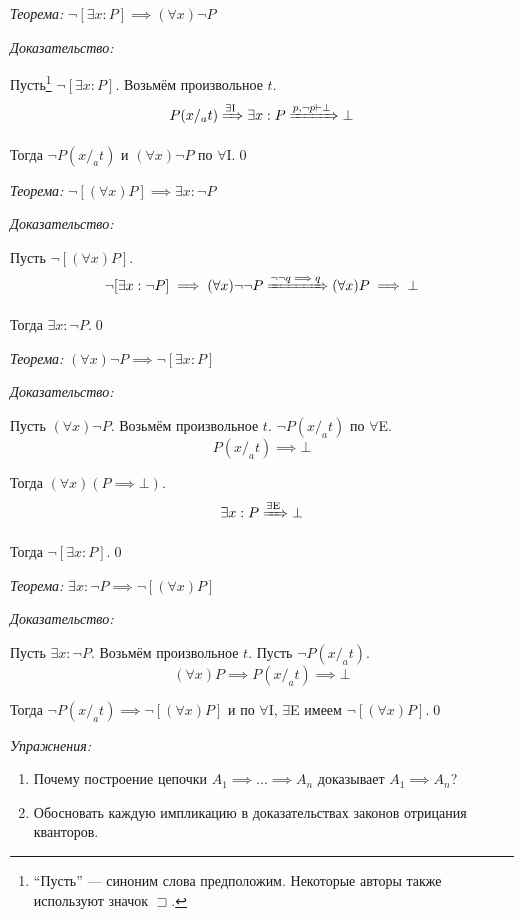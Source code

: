 {\it Теорема:} $\lnot[\exists x:P]\implies (\forall x)\lnot P$

{\it Доказательство:}

Пусть\footnote{
	``Пусть'' --- синоним слова предположим. Некоторые авторы также
	используют значок $\sqsupset$.
} $\lnot[\exists x:P]$. Возьмём произвольное $t$.
\[
	P(x/_{a}t)\xRightarrow{\text{$\exists$I}} \exists x:P
	\xRightarrow{p,\lnot p\vdash\bot} \bot
\]

Тогда $\lnot P(x/_{a}t)$ и $(\forall x)\lnot P$
по $\forall$I.\qed

{\it Теорема:} $\lnot[(\forall x)P]\implies \exists x:\lnot P$

{\it Доказательство:}

Пусть $\lnot[(\forall x)P]$.
\[
	\lnot[\exists x:\lnot P]\implies (\forall x)\lnot\lnot P
	\xRightarrow{\lnot\lnot q\implies q} (\forall x)P\implies\bot
\]

Тогда $\exists x:\lnot P$.\qed

{\it Теорема:} $(\forall x)\lnot P\implies \lnot[\exists x:P]$

{\it Доказательство:}

Пусть $(\forall x)\lnot P$. Возьмём произвольное $t$. $\lnot P(x/_{a}t)$ по $\forall$E.
\[
	P(x/_{a}t)\implies \bot
\]

Тогда $(\forall x)(P\implies \bot)$.
\[
	\exists x:P\xRightarrow{\text{$\exists$E}} \bot
\]

Тогда $\lnot[\exists x:P]$.\qed

{\it Теорема:} $\exists x:\lnot P\implies\lnot[(\forall x)P]$

{\it Доказательство:}

Пусть $\exists x:\lnot P$. Возьмём произвольное $t$. Пусть $\lnot P(x/_{a}t)$.
\[
	(\forall x)P\implies P(x/_{a}t)\implies \bot
\]

Тогда ${\lnot P(x/_{a}t)\implies \lnot[(\forall x)P]}$ и по $\forall$I, $\exists$E
имеем $\lnot[(\forall x)P]$.\qed

{\it Упражнения:}
\begin{enumerate}
	\item{}Почему построение цепочки $A_1\implies...\implies A_{n}$
	доказывает $A_1\implies A_{n}$?
	\item{}Обосновать каждую импликацию в доказательствах законов отрицания кванторов.
\end{enumerate}

\pagebreak
